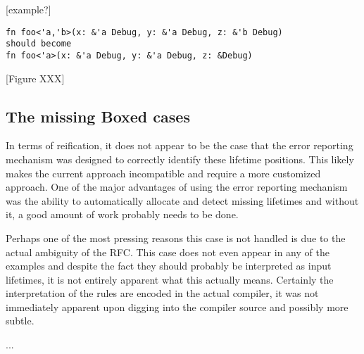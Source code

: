 [example?]
\begin{verbatim}
fn foo<'a,'b>(x: &'a Debug, y: &'a Debug, z: &'b Debug)
should become
fn foo<'a>(x: &'a Debug, y: &'a Debug, z: &Debug)
\end{verbatim}
[Figure XXX]

\subsection{The missing Boxed cases}
In terms of reification, it does not appear to be the case that the error reporting mechanism was designed to correctly identify these lifetime positions. This likely makes the current approach incompatible and require a more customized approach. One of the major advantages of using the error reporting mechanism was the ability to automatically allocate and detect missing lifetimes and without it, a good amount of work probably needs to be done.

Perhaps one of the most pressing reasons this case is not handled is due to the actual ambiguity of the RFC. This case does not even appear in any of the examples and despite the fact they should probably be interpreted as input lifetimes, it is not entirely apparent what this actually means. Certainly the interpretation of the rules are encoded in the actual compiler, it was not immediately apparent upon digging into the compiler source and possibly more subtle.

...

